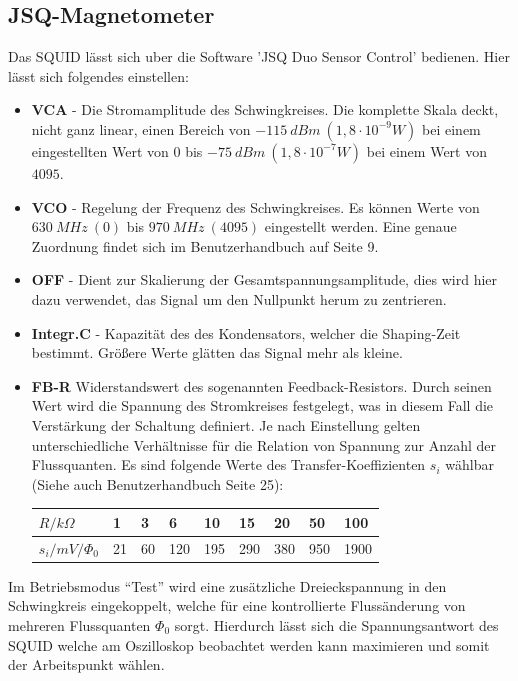 \documentclass[12pt]{article}
\begin{document}
\subsection{JSQ-Magnetometer}
\label{jsq}
Das SQUID lässt sich uber die Software ’JSQ Duo Sensor Control’ bedienen. Hier lässt sich folgendes einstellen:
\begin{itemize}
 \item \textbf{VCA} - Die Stromamplitude des Schwingkreises. Die komplette Skala deckt, nicht ganz linear, einen
       Bereich von $-115~dBm ~(1, 8 \cdot 10^{-9} W)$ bei einem eingestellten Wert von $0$ bis $-75~ dBm ~(1,8 \cdot 10^{-7} W)$ bei einem Wert von $4095$.
 \item \textbf{VCO} - Regelung der Frequenz des Schwingkreises. Es können Werte von $630~MHz~(0)$ bis $970~MHz~(4095)$ eingestellt werden. Eine genaue
       Zuordnung findet sich im Benutzerhandbuch auf Seite 9.
 \item \textbf{OFF} - Dient zur Skalierung der Gesamtspannungsamplitude, dies wird hier dazu verwendet, das Signal um den Nullpunkt herum zu zentrieren.
 \item \textbf{Integr.C} - Kapazität des des Kondensators, welcher die Shaping-Zeit bestimmt. Größere Werte glätten das Signal mehr als kleine.
 \item \textbf{FB-R} Widerstandswert des sogenannten Feedback-Resistors. Durch seinen Wert wird die Spannung des Stromkreises festgelegt, was in
       diesem Fall die Verstärkung der Schaltung definiert. Je nach Einstellung gelten unterschiedliche Verhältnisse für die Relation von Spannung
       zur Anzahl der Flussquanten. Es sind folgende Werte des Transfer-Koeffizienten $s_i$ wählbar (Siehe auch Benutzerhandbuch Seite 25):
       \begin{center}
\begin{tabular}{|l|llllllll|}
\hline 
$R / k\Omega$ & 1 & 3 & 6 & 10 & 15 & 20 & 50 & 100\\
\hline 
$s_i / mV / \Phi_0$ & 21 & 60 & 120 & 195 & 290 & 380 & 950 & 1900\\
\hline 
       \end{tabular}
       \end{center}


\end{itemize}

Im Betriebsmodus "`Test"' wird eine zusätzliche Dreieckspannung in den Schwingkreis eingekoppelt, welche für eine kontrollierte Flussänderung von mehreren Flussquanten $\Phi_0$ sorgt. Hierdurch lässt sich die Spannungsantwort des SQUID welche am Oszilloskop beobachtet werden kann maximieren und somit der Arbeitspunkt wählen.\\
\end{document}
